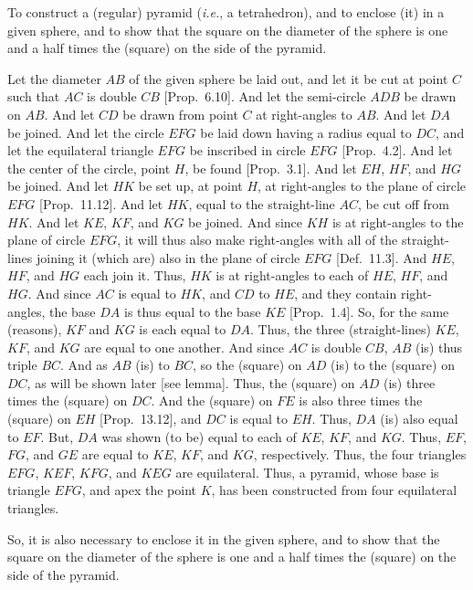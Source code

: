 \begin{Parallel}{}{}
{To construct a (regular) pyramid ({\em i.e.}, a tetrahedron), and to
enclose (it) in a given sphere, and to show that the square on the
diameter of the sphere is one and a half times the (square) on the side 
of the pyramid. 

Let the diameter $AB$ of the given sphere be laid out, and let it be
cut at point $C$ such that $AC$ is double $CB$ [Prop.~6.10]. And let the semi-circle 
$ADB$  be drawn on $AB$. And let $CD$ be drawn from point
$C$ at right-angles to $AB$. And let $DA$ be joined. 
And let the circle $EFG$ be laid down having a radius equal to $DC$,
and let the equilateral triangle $EFG$ be inscribed in circle
$EFG$ [Prop.~4.2]. And let the center of the circle, point $H$,
be found [Prop.~3.1]. And let $EH$, $HF$, and $HG$ be
joined. And let $HK$ be set up, at point $H$, at right-angles to the
plane of circle $EFG$ [Prop.~11.12]. And let $HK$, equal to the straight-line $AC$, be cut off from $HK$. And let $KE$, $KF$, and $KG$ be joined.
And since $KH$ is at right-angles to the plane of circle $EFG$, it will
thus also make right-angles with all of the straight-lines joining it
(which are) also in the plane of circle $EFG$ [Def.~11.3]. And $HE$, $HF$,
and $HG$ each join it. Thus, $HK$ is at right-angles to each of $HE$,
$HF$, and $HG$. And since  $AC$ is equal to $HK$, and $CD$ to
$HE$, and they contain right-angles, the base $DA$ is thus equal to the base 
$KE$ [Prop.~1.4]. So, for the same (reasons),  $KF$ and
$KG$ is each equal to $DA$. Thus, the three (straight-lines)
$KE$, $KF$, and $KG$ are equal to one another. And since 
$AC$ is double $CB$, $AB$ (is) thus triple $BC$. And as 
$AB$ (is) to $BC$, so the (square) on $AD$ (is) to the (square)
on $DC$, as will be shown later [see lemma]. Thus, the (square)
on $AD$ (is) three times the (square) on $DC$. And the (square)
on $FE$ is also three times the (square) on $EH$ [Prop.~13.12], 
and $DC$ is equal to $EH$. Thus, $DA$ (is) also equal to $EF$.
But, $DA$ was shown (to be) equal to each of $KE$, $KF$, and
$KG$. Thus, $EF$, $FG$, and $GE$ are equal to 
$KE$, $KF$, and $KG$, respectively. Thus, the four triangles $EFG$, $KEF$,
$KFG$, and $KEG$ are equilateral. Thus, a pyramid, whose base is triangle
$EFG$, and apex the point $K$,   has been
constructed from four equilateral triangles.

\epsfysize=3.5in
\centerline{}

So, it is also necessary to enclose it in the given sphere, and to show that
the square on the diameter of the sphere is one and a half times the (square)
on the side of the pyramid. 

}
\end{Parallel}
